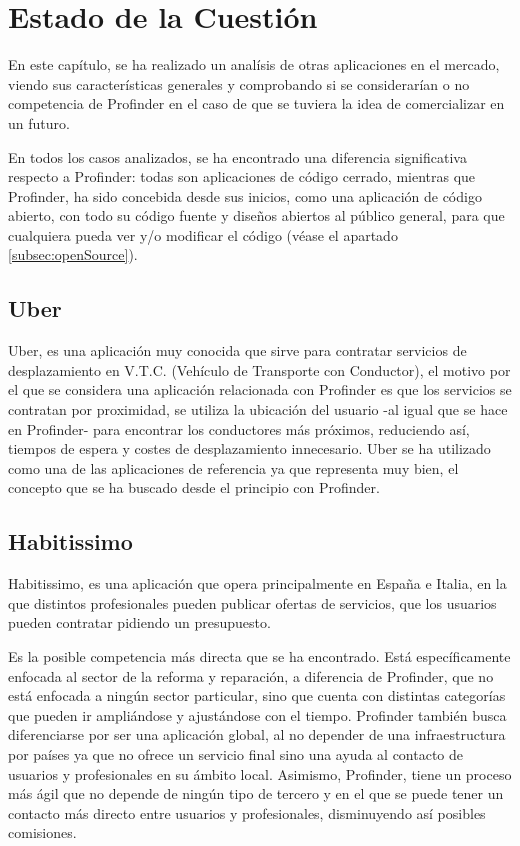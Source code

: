 \chapter{Estado de la Cuestión}
\label{cap:estadoDeLaCuestion}
En este capítulo, se ha realizado un analísis de otras aplicaciones en el mercado, viendo sus características generales y comprobando si se considerarían o no competencia de Profinder en el caso de que se tuviera la idea de comercializar en un futuro. 

En todos los casos analizados, se ha encontrado una diferencia significativa respecto a Profinder: todas son aplicaciones de código cerrado, mientras que Profinder, ha sido concebida desde sus inicios, como una aplicación de código abierto, con todo su código fuente y diseños abiertos al público general, para que cualquiera pueda ver y/o modificar el código (véase el apartado \ref{subsec:openSource}).
\section{Uber}
Uber\hyperlink{cap:biblio}{}, es una aplicación muy conocida que sirve para contratar servicios de desplazamiento en V.T.C. (Vehículo de Transporte con Conductor), el motivo por el que se considera una aplicación relacionada con Profinder es que los servicios se contratan por proximidad, se utiliza la ubicación del usuario -al igual que se hace en Profinder- para encontrar los conductores más próximos, reduciendo así, tiempos de espera y costes de desplazamiento innecesario. Uber se ha utilizado como una de las aplicaciones de referencia ya que representa muy bien, el concepto que se ha buscado desde el principio con Profinder.
\section{Habitissimo}
Habitissimo\hyperlink{cap:biblio}{},
es una aplicación que opera principalmente en España e Italia, en la que distintos profesionales pueden publicar ofertas de servicios, que los usuarios pueden contratar pidiendo un presupuesto. 

Es la posible competencia más directa que se ha encontrado. Está específicamente enfocada al sector de la reforma y reparación, a diferencia de Profinder, que no está enfocada a ningún sector particular, sino que cuenta con distintas categorías que pueden ir ampliándose y ajustándose con el tiempo. Profinder también busca diferenciarse por ser una aplicación global, al no depender de una infraestructura por países ya que no ofrece un servicio final sino una ayuda al contacto de usuarios y profesionales en su ámbito local. Asimismo, Profinder, tiene un proceso más ágil que no depende de ningún tipo de tercero y en el que se puede tener un contacto más directo entre usuarios y profesionales, disminuyendo así posibles comisiones.

